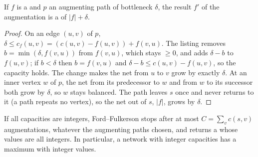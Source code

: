 \label{lst:b2:flows-and-matchings:network}

\label{lst:b2:flows-and-matchings:maxflow}

\begin{lemma}\label{lem:b2:flows-and-matchings:augment}
If $f$ is a  and $p$ an augmenting path of bottleneck $\delta$, the result $f'$ of the augmentation is a  of
 $|f| + \delta$.
\end{lemma}

\begin{proof}
On an edge $(u, v)$ of $p$, $\delta \leq c_f(u, v) = (c(u, v) - f(u, v)) + f(v, u)$. The listing removes $b = \min(\delta,
f(v, u))$ from $f(v, u)$, which stays $\geq 0$, and adds $\delta - b$ to $f(u, v)$; if $b < \delta$ then $b = f(v, u)$ and
$\delta - b \leq c(u, v) - f(u, v)$, so the capacity holds. The change makes the net  from $u$ to $v$ grow by
exactly $\delta$. At an inner vertex $w$ of $p$, the net  from its predecessor to $w$ and from $w$ to its successor
both grow by $\delta$, so $w$ stays balanced. The path leaves $s$ once and never returns to it (a path repeats no
vertex), so the net  out of $s$, $|f|$, grows by $\delta$.
\end{proof}

\begin{theorem}\label{thm:b2:flows-and-matchings:integrality}
If all capacities are integers, Ford--Fulkerson stops after at most $C = \sum_{v} c(s, v)$ augmentations, whatever the
augmenting paths chosen, and returns a  whose values are all integers. In particular, a network with integer
capacities has a maximum  with integer values.
\end{theorem}

